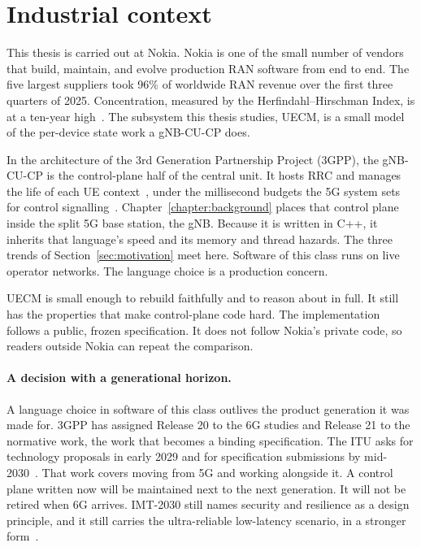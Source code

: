\documentclass[english,oneside,a4paper,censored,csm,software-track-2020]{HYthesisML}
\begin{document}
\section{Industrial context}\label{sec:industrial}
This thesis is carried out at Nokia.
Nokia is one of the small number of vendors that build, maintain, and evolve production RAN software from end to end.
The five largest suppliers took 96\% of worldwide RAN revenue over the first three quarters of 2025.
Concentration, measured by the Herfindahl--Hirschman Index, is at a ten-year high~\cite{delloro2025ran3q,delloro2026ran}.
The subsystem this thesis studies, UECM, is a small model of the per-device state work a gNB-CU-CP does.

In the architecture of the 3rd Generation Partnership Project (3GPP), the gNB-CU-CP is the control-plane half of the central unit.
It hosts RRC and manages the life of each UE context~\cite{3gpp38401,3gpp38331}, under the millisecond budgets the 5G system sets for control signalling~\cite{3gpp38913}.
Chapter~\ref{chapter:background} places that control plane inside the split 5G base station, the gNB.
Because it is written in C++, it inherits that language's speed and its memory and thread hazards.
The three trends of Section~\ref{sec:motivation} meet here.
Software of this class runs on live operator networks.
The language choice is a production concern.

UECM is small enough to rebuild faithfully and to reason about in full.
It still has the properties that make control-plane code hard.
The implementation follows a public, frozen specification. It does not follow Nokia's private code, so readers outside Nokia can repeat the comparison.

\paragraph{A decision with a generational horizon.}
A language choice in software of this class outlives the product generation it was made for.
3GPP has assigned Release 20 to the 6G studies and Release 21 to the normative work, the work that becomes a binding specification.
The ITU asks for technology proposals in early 2029 and for specification submissions by mid-2030~\cite{3gpp2024road6g}.
That work covers moving from 5G and working alongside it.
A control plane written now will be maintained next to the next generation. It will not be retired when 6G arrives.
IMT-2030 still names security and resilience as a design principle, and it still carries the ultra-reliable low-latency scenario, in a stronger form~\cite{itu2023imt2030}.
\end{document}
